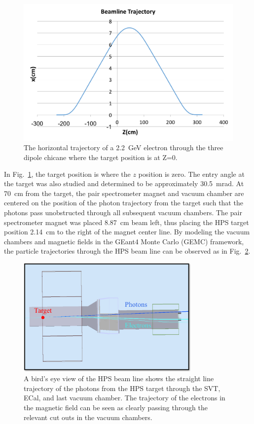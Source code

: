 \begin{figure}[H]
  \centering
      \includegraphics[width=1.0\textwidth]{pics/experiment/feetrajectory.png}
  \caption[Charged particle trajectory in HPS beamline]{The horizontal trajectory of a 2.2~GeV electron through the three dipole chicane where the target position is at Z=0.}
  \label{Figure:trajectory}
\end{figure}

In Fig.~\ref{Figure:trajectory}, the target position is where the $z$ position is zero. The entry angle at the target was also studied and determined to be approximately 30.5~mrad. At 70~cm from the target, the pair spectrometer magnet and vacuum chamber are centered on the position of the photon trajectory from the target such that the photons pass unobstructed through all subsequent vacuum chambers. The pair spectrometer magnet was placed 8.87~cm beam left, thus placing the HPS target position 2.14~cm to the right of the magnet center line. By modeling the vacuum chambers and magnetic fields in the GEant4 Monte Carlo (GEMC) framework, the particle trajectories through the HPS beam line can be observed as in Fig.~\ref{Figure:gemc}.

\begin{figure}[H]
  \centering
      \includegraphics[width=0.8\textwidth]{pics/experiment/beamlineGemc.png}
  \caption[HPS beamline simulation in GEMC]{A bird's eye view of the HPS beam line shows the straight line trajectory of the photons from the HPS target through the SVT, ECal, and last vacuum chamber. The trajectory of the electrons in the magnetic field can be seen as clearly passing through the relevant cut outs in the vacuum chambers.}
  \label{Figure:gemc}
\end{figure}
 
